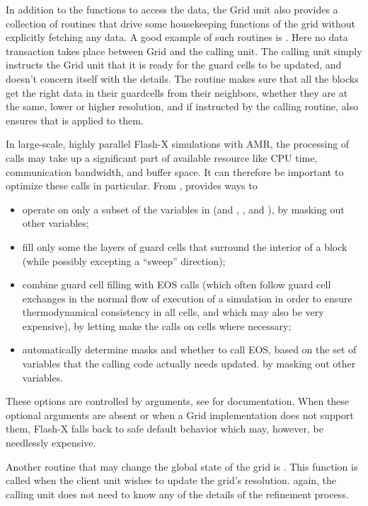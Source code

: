 In addition to the functions to access the data, the \unit{Grid} unit also
provides a collection of routines that drive some housekeeping
functions of the grid without explicitly fetching any data. A good
example of such routines is . Here no
data transaction takes place between \unit{Grid} and the calling
unit. The calling unit simply instructs the \unit{Grid} unit that it is ready for
the guard cells to be updated, and doesn't concern itself with the
details. The  routine makes sure that all the
blocks get the right data in their guardcells from their neighbors,
whether they are at the same, lower or higher resolution, and if
instructed by the calling routine, also ensures that  is
applied to them.

In large-scale, highly parallel Flash-X simulations with AMR, the processing
of  calls may take up a significant part of
available resource like CPU time, communication bandwidth, and buffer space.
It can therefore be important to optimize these calls in particular.
From \flashx,  provides ways to
\begin{itemize}
\item operate on only a subset of the variables in 
(and , , and ),
by masking out other variables;
\item fill only some the  layers of guard cells
that surround the interior of a block (while possibly excepting a ``sweep''
direction);
\item combine guard cell filling with EOS calls (which often follow
guard cell exchanges in the normal flow of execution of a simulation
in order to ensure thermodynamical consistency in all cells, and which
may also be very expensive), by letting  
make the calls on cells where necessary;
\item automatically determine masks and whether to call EOS, based on
the set of variables that the calling code actually needs updated.
by masking out other variables.
\end{itemize}
These options are controlled by  arguments, see
 for documentation.
When these optional arguments are absent or when a \unit{Grid}
implementation does not support them, Flash-X falls back to
safe default behavior which may, however, be needlessly expensive.

Another routine that may change the global state of the grid is
. This function is called
when the client unit wishes to update the grid's resolution. again,
the calling unit  does not need to know any of the details of the
refinement process.

